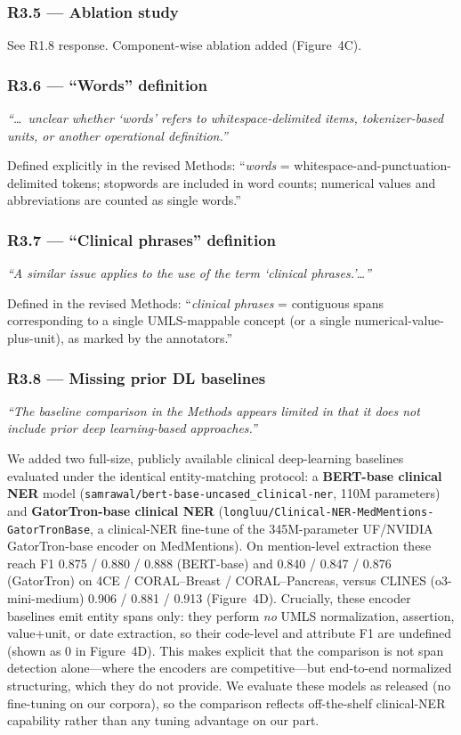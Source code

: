 \documentclass[11pt,letterpaper]{article}
\newcommand{\reviewer}[1]{\par\medskip\textcolor{blue!75!black}{\textit{#1}}\par\medskip}
\newcommand{\response}[1]{\par#1\par\medskip}
\begin{document}
\subsubsection*{R3.5 --- Ablation study}
\response{See R1.8 response. Component-wise ablation added (Figure~4C).}

\subsubsection*{R3.6 --- ``Words'' definition}
\reviewer{``\dots\ unclear whether `words' refers to whitespace-delimited items, tokenizer-based units, or another operational definition.''}
\response{Defined explicitly in the revised Methods: ``\emph{words} = whitespace-and-punctuation-delimited tokens; stopwords are included in word counts; numerical values and abbreviations are counted as single words.''}

\subsubsection*{R3.7 --- ``Clinical phrases'' definition}
\reviewer{``A similar issue applies to the use of the term `clinical phrases.'\dots''}
\response{Defined in the revised Methods: ``\emph{clinical phrases} = contiguous spans corresponding to a single UMLS-mappable concept (or a single numerical-value-plus-unit), as marked by the annotators.''}

\subsubsection*{R3.8 --- Missing prior DL baselines}
\reviewer{``The baseline comparison in the Methods appears limited in that it does not include prior deep learning-based approaches.''}
\response{We added two full-size, publicly available clinical deep-learning baselines evaluated under the identical entity-matching protocol: a \textbf{BERT-base clinical NER} model (\nolinkurl{samrawal/bert-base-uncased_clinical-ner}, 110M parameters) and \textbf{GatorTron-base clinical NER} (\nolinkurl{longluu/Clinical-NER-MedMentions-GatorTronBase}, a clinical-NER fine-tune of the 345M-parameter UF/NVIDIA GatorTron-base encoder on MedMentions). On mention-level extraction these reach F1 0.875 / 0.880 / 0.888 (BERT-base) and 0.840 / 0.847 / 0.876 (GatorTron) on 4CE / CORAL--Breast / CORAL--Pancreas, versus CLINES (o3-mini-medium) 0.906 / 0.881 / 0.913 (Figure~4D). Crucially, these encoder baselines emit entity spans only: they perform \emph{no} UMLS normalization, assertion, value+unit, or date extraction, so their code-level and attribute F1 are undefined (shown as 0 in Figure~4D). This makes explicit that the comparison is not span detection alone---where the encoders are competitive---but end-to-end normalized structuring, which they do not provide. We evaluate these models as released (no fine-tuning on our corpora), so the comparison reflects off-the-shelf clinical-NER capability rather than any tuning advantage on our part.}
\end{document}
